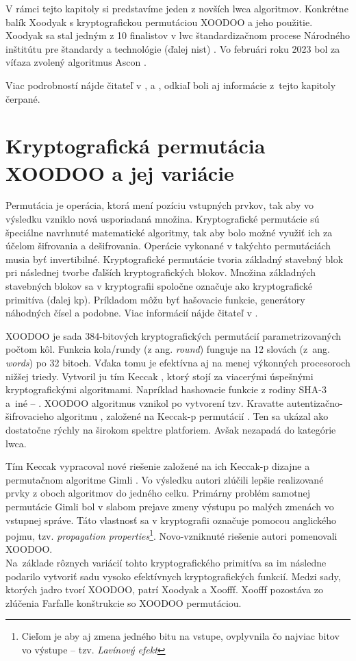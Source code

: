 V rámci tejto kapitoly si predstavíme jeden z novších \acrshort{lwca} algoritmov. Konkrétne balík Xoodyak s kryptografickou permutáciou XOODOO \cite{tkecak} a jeho použitie. Xoodyak sa stal jedným z 10 finalistov v \acrshort{lwc} štandardizačnom procese Národného inštitútu pre štandardy a technológie (ďalej \acrshort{nist}) \cite{lwc3}. Vo februári roku 2023 bol za víťaza zvolený algoritmus Ascon \cite{ascon}.

Viac podrobností nájde čitateľ v \cite{lwc}, \cite{lwc2} a \cite{lwc3}, odkiaľ boli aj informácie z~tejto kapitoly čerpané. 
        
\section{Kryptografická permutácia XOODOO a jej variácie}
Permutácia je operácia, ktorá mení pozíciu vstupných prvkov, tak aby vo výsledku vzniklo nová usporiadaná množina. Kryptografické permutácie sú špeciálne navrhnuté matematické algoritmy, tak aby bolo možné využiť ich za účelom šifrovania a dešifrovania. Operácie vykonané v takýchto permutáciách musia byť invertibilné. Kryptografické permutácie tvoria základný stavebný blok pri následnej tvorbe ďalších kryptografických blokov. Množina základných stavebných blokov sa v kryptografii spoločne označuje ako kryptografické primitíva (ďalej \acrshort{kp}). Príkladom môžu byť hašovacie funkcie, generátory náhodných čísel a podobne. Viac informácií nájde čitateľ v \cite{kp}.  
 
XOODOO je sada 384-bitových kryptografických permutácií parametrizovaných počtom kôl. Funkcia kola/rundy (z ang. \textit{round}) funguje na 12 slovách (z~ang. \textit{words}) po 32 bitoch. Vďaka tomu je efektívna aj na menej výkonných procesoroch nižšej triedy. Vytvoril ju tím Keccak \cite{kecak}, ktorý stojí za viacerými úspešnými kryptografickými algoritmami. Napríklad hashovacie funkcie z rodiny SHA-3 a~iné -- \cite{kecsup}. XOODOO algoritmus vznikol po vytvorení tzv. Kravatte autentizačno-šifrovacieho algoritmu \cite{kravatte}, založené na Keccak-p permutácií \cite{keccakp}. Ten sa ukázal ako dostatočne rýchly na širokom spektre platforiem. Avšak nezapadá do kategórie \acrshort{lwca}.

Tím Keccak vypracoval nové riešenie založené na ich Keccak-p dizajne a permutačnom algoritme Gimli \cite{bernstein2017gimli}. Vo výsledku autori zlúčili lepšie realizované prvky z oboch algoritmov do jedného celku. Primárny problém samotnej permutácie Gimli bol v slabom prejave zmeny výstupu po malých zmenách vo vstupnej správe. Táto vlastnosť sa v kryptografii označuje pomocou anglického pojmu, tzv. \textit{propagation properties}\footnote{Cieľom je aby aj zmena jedného bitu na vstupe, ovplyvnila čo najviac bitov vo výstupe -- tzv. \textit{Lavínový efekt}}. Novo-vzniknuté riešenie autori pomenovali XOODOO.\\ Na~základe rôznych variácií tohto kryptografického primitíva sa im následne podarilo vytvoriť sadu vysoko efektívnych kryptografických funkcií. 
Medzi sady, ktorých jadro tvorí XOODOO, patrí Xoodyak a Xoofff. Xoofff pozostáva zo zlúčenia Farfalle konštrukcie \cite{farfalle} so XOODOO permutáciou. 

